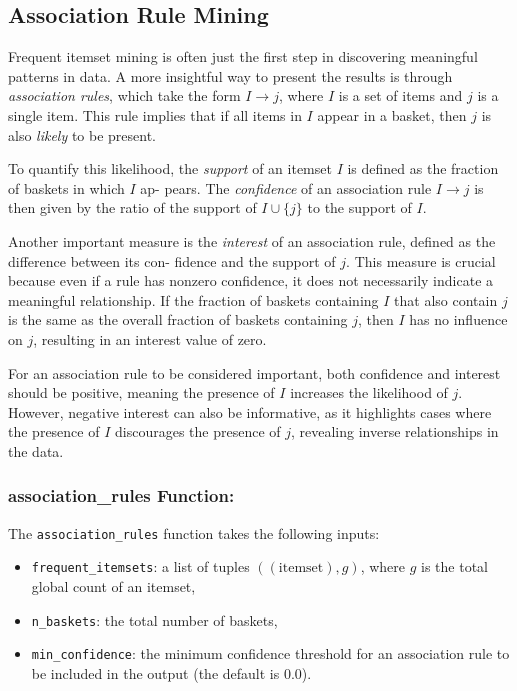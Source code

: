 \documentclass{Class/julia}
\begin{document}
\subsection{Association Rule Mining}

Frequent itemset mining is often just the first step in discovering meaningful patterns in data. A more insightful way to present the results is through \textit{association rules}, which take the form \( I \rightarrow j \), where \( I \) is a set of items and \( j \) is a single item. This rule implies that if all items in \( I \) appear in a basket, then \( j \) is also \textit{likely} to be present.

To quantify this likelihood, the \textit{support} of an itemset \( I \) is defined as the fraction of baskets in which \( I \) ap- pears. The \textit{confidence} of an association rule \( I \rightarrow j \) is then given by the ratio of the support of \( I \cup \{j\} \) to the support of \( I \).

Another important measure is the \textit{interest} of an association rule, defined as the difference between its con- fidence and the support of \( j \). This measure is crucial because even if a rule has nonzero confidence, it does not necessarily indicate a meaningful relationship. If the fraction of baskets containing \( I \) that also contain \( j \) is the same as the overall fraction of baskets containing \( j \), then \( I \) has no influence on \( j \), resulting in an interest value of zero. 

For an association rule to be considered important, both confidence and interest should be positive, meaning the presence of \( I \) increases the likelihood of \( j \). However, negative interest can also be informative, as it highlights cases where the presence of \( I \) discourages the presence of \( j \), revealing inverse relationships in the data.

\subsubsection*{association\_rules Function:}

The \texttt{association\_rules} function takes the following inputs:

\begin{itemize}
    \item \texttt{frequent\_itemsets}: a list of tuples \(((\text{itemset}), g)\), where \( g \) is the total global count of an itemset,
    \item \texttt{n\_baskets}: the total number of baskets,
    \item \texttt{min\_confidence}: the minimum confidence threshold for an association rule to be included in the output (the default is 0.0).
\end{itemize}
\end{document}
